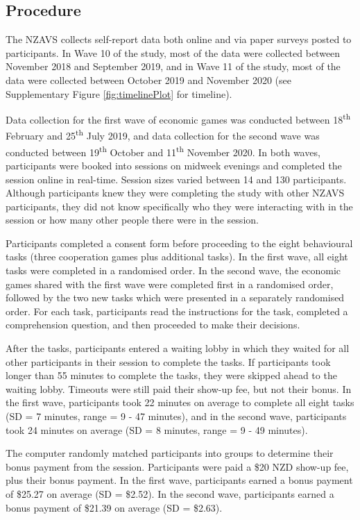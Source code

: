 \documentclass[
  man,floatsintext]{apa6}
\begin{document}
\hypertarget{procedure}{%
\subsection{Procedure}\label{procedure}}

The NZAVS collects self-report data both online and via paper surveys posted to participants. In Wave 10 of the study, most of the data were collected between November 2018 and September 2019, and in Wave 11 of the study, most of the data were collected between October 2019 and November 2020 (see Supplementary Figure \ref{fig:timelinePlot} for timeline).

Data collection for the first wave of economic games was conducted between 18\textsuperscript{th} February and 25\textsuperscript{th} July 2019, and data collection for the second wave was conducted between 19\textsuperscript{th} October and 11\textsuperscript{th} November 2020. In both waves, participants were booked into sessions on midweek evenings and completed the session online in real-time. Session sizes varied between 14 and 130 participants. Although participants knew they were completing the study with other NZAVS participants, they did not know specifically who they were interacting with in the session or how many other people there were in the session.

Participants completed a consent form before proceeding to the eight behavioural tasks (three cooperation games plus additional tasks). In the first wave, all eight tasks were completed in a randomised order. In the second wave, the economic games shared with the first wave were completed first in a randomised order, followed by the two new tasks which were presented in a separately randomised order. For each task, participants read the instructions for the task, completed a comprehension question, and then proceeded to make their decisions.

After the tasks, participants entered a waiting lobby in which they waited for all other participants in their session to complete the tasks. If participants took longer than 55 minutes to complete the tasks, they were skipped ahead to the waiting lobby. Timeouts were still paid their show-up fee, but not their bonus. In the first wave, participants took 22 minutes on average to complete all eight tasks (SD = 7 minutes, range = 9 - 47 minutes), and in the second wave, participants took 24 minutes on average (SD = 8 minutes, range = 9 - 49 minutes).

The computer randomly matched participants into groups to determine their bonus payment from the session. Participants were paid a \$20 NZD show-up fee, plus their bonus payment. In the first wave, participants earned a bonus payment of \$25.27 on average (SD = \$2.52). In the second wave, participants earned a bonus payment of \$21.39 on average (SD = \$2.63).
\end{document}
